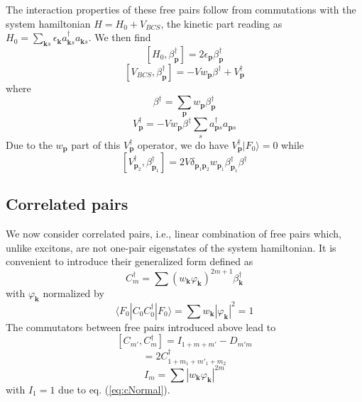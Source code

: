 \documentclass[aps,prb,preprint,groupedaddress,amsmath]{revtex4-1}
\newcommand{\vp}{\ensuremath{\mathbf{p}}}
\newcommand{\vk}{\ensuremath{\mathbf{k}}}
\newcommand{\dg}{\ensuremath{\dagger}}
\begin{document}
The interaction properties of these free pairs follow from commutations with the system hamiltonian $H=H_0+V_{BCS}$, the kinetic part reading as $H_0=\sum_{\vk{s}}\epsilon_\vk{}a^\dg_{\vk{s}}a^{}_{\vk{s}}$. We then find
\begin{equation}  \label{eq:betaH}
\left[H_0,\beta^{\dagger}_\vp\right]  =2\epsilon_\vp\beta^{\dagger}_\vp
\end{equation}
\begin{equation}  \label{eq:vbeta}
\left[V_{BCS},\beta^{\dagger}_\vp\right] 
=-Vw^{}_\vp\beta^{\dagger}+V^{\dagger}_\vp
\end{equation}
where 
\begin{equation}
\beta^{\dagger}=\sum_\vp{}w_\vp\beta^{\dagger}_\vp
\end{equation}
\begin{equation}
V^\dg_\vp=-Vw^{}_\vp\beta^{\dagger}\sum_s{}a^\dg_{\vp{s}}a^{}_{\vp{s}}
\end{equation}
Due to the $w_\vp$ part of this $V^\dg_\vp$ operator, we do have $V^\dg_\vp|F_0{\rangle}=0$ while 
\begin{equation}  \label{eq:vpotbeta}
\left[V^{\dagger}_{\mathbf{p} _2},\beta^{\dagger}_{\mathbf{p} _1}\right] 
=2V\delta_{\mathbf{p} _1\mathbf{p} _2}w_{\mathbf{p} _1}\beta^{\dagger}_{\mathbf{p} _1}\beta^{\dagger}_{}
\end{equation}

\subsection{Correlated pairs}


We now consider correlated pairs, i.e., linear combination of free pairs which, unlike excitons, are not  one-pair eigenstates of the system hamiltonian.  It is convenient to introduce their generalized form defined as 
\begin{equation}\label{eq:C}
{C}_m^\dg=\sum{(w_\vk\varphi_\vk)}^{2m+1}\beta^\dg_\vk
\end{equation}
with  $\varphi_\vk$ normalized by 
\begin{equation}\label{eq:cNormal}
\langle{}F_0|{C_0^{ }}{C_0^\dg}|F_0{\rangle}=\sum{w_\vk}|\varphi_\vk|^{2}=1
\end{equation}
The commutators between free pairs introduced above lead to  
\begin{equation}\label{eq:ID}
[{C}_{m'},C^\dg_m]=I_{1+m+m'}-D_{m'm}
\end{equation}
\begin{equation}
[{D}_{m'_1,m_1},C^\dg_{m_2}]=2C^\dg_{1+m_1+m'_1+m_2}
\end{equation}
\begin{equation}
I_m=\sum|w_\vk\varphi_\vk|^{2m}
\end{equation}
with $I_1=1$ due to eq. (\ref{eq:cNormal}).
\end{document}

